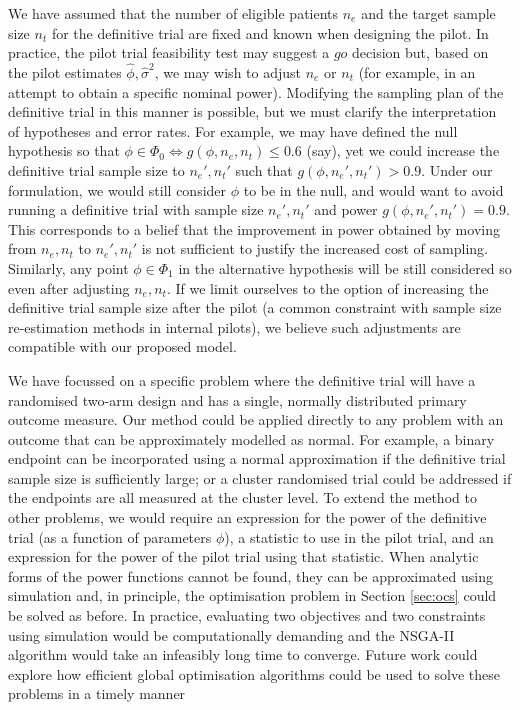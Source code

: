 \documentclass[AMA,STIX1COL]{WileyNJD-v2}
\begin{document}
We have assumed that the number of eligible patients $n_e$ and the target sample size $n_t$ for the definitive trial are fixed and known when designing the pilot. In practice, the pilot trial feasibility test may suggest a $go$ decision but, based on the pilot estimates $\hat{\phi}, \hat{\sigma}^2$, we may wish to adjust $n_e$ or $n_t$ (for example, in an attempt to obtain a specific nominal power). Modifying the sampling plan of the definitive trial in this manner is possible, but we must clarify the interpretation of hypotheses and error rates. For example, we may have defined the null hypothesis so that $\phi \in \Phi_0 \Leftrightarrow g(\phi, n_e, n_t) \leq 0.6$ (say), yet we could increase the definitive trial sample size to $n_e', n_t'$ such that $g(\phi, n_e', n_t') > 0.9$. Under our formulation, we would still consider $\phi$ to be in the null, and would want to avoid running a definitive trial with sample size $n_e', n_t'$ and power $g(\phi, n_e', n_t') = 0.9$. This corresponds to a belief that the improvement in power obtained by moving from $n_e, n_t$ to $n_e', n_t'$ is not sufficient to justify the increased cost of sampling. Similarly, any point $\phi \in \Phi_1$ in the alternative hypothesis will be still considered so even after adjusting $n_e, n_t$. If we limit ourselves to the option of increasing the definitive trial sample size after the pilot (a common constraint with sample size re-estimation methods in internal pilots\cite{Friede2006}), we believe such adjustments are compatible with our proposed model.


We have focussed on a specific problem where the definitive trial will have a randomised two-arm design and has a single, normally distributed primary outcome measure. Our method could be applied directly to any problem with an outcome that can be approximately modelled as normal. For example, a binary endpoint can be incorporated using a normal approximation if the definitive trial sample size is sufficiently large; or a cluster randomised trial could be addressed if the endpoints are all measured at the cluster level. To extend the method to other problems, we would require an expression for the power of the definitive trial (as a function of parameters $\phi$), a statistic to use in the pilot trial, and an expression for the power of the pilot trial using that statistic. When analytic forms of the power functions cannot be found, they can be approximated using simulation \cite{Landau2013} and, in principle, the optimisation problem in Section \ref{sec:ocs} could be solved as before. In practice, evaluating two objectives and two constraints using simulation would be computationally demanding and the NSGA-II algorithm would take an infeasibly long time to converge. Future work could explore how efficient global optimisation algorithms \cite{Jones2001} could be used to solve these problems in a timely manner 
\end{document}
